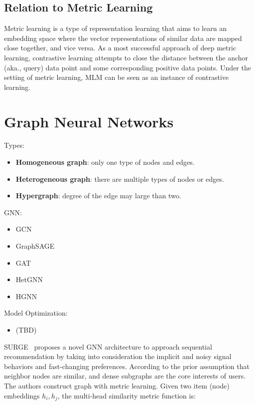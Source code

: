 \subsection{Relation to Metric Learning}

Metric learning is a type of representation learning that aims to learn an embedding space where the vector representations of similar data are mapped close together, and vice versa.
As a most successful approach of deep metric learning, contrastive learning attempts to close the distance between the anchor (aka., query) data point and some corresponding positive data points.
Under the setting of metric learning, MLM can be seen as an instance of contrastive learning.

\section{Graph Neural Networks}

Types:

\begin{itemize}
	\item \textbf{Homogeneous graph}: only one type of nodes and edges.
	\item \textbf{Heterogeneous graph}: there are multiple types of nodes or edges.
	\item \textbf{Hypergraph}: degree of the edge may large than two.
\end{itemize}

GNN:

\begin{itemize}
	\item GCN
	\item GraphSAGE
	\item GAT
	\item HetGNN
	\item HGNN
\end{itemize}

Model Optimization:

\begin{itemize}
	\item (TBD)
\end{itemize}

SURGE~ proposes a novel GNN architecture to approach sequential recommendation by taking into consideration the implicit and noisy signal behaviors and fast-changing preferences.
According to the prior assumption that neighbor nodes are similar, and dense subgraphs are the core interests of users.
The authors construct graph with metric learning.
Given two item (node) embeddings $h_i, h_j$, the multi-head similarity metric function is:

